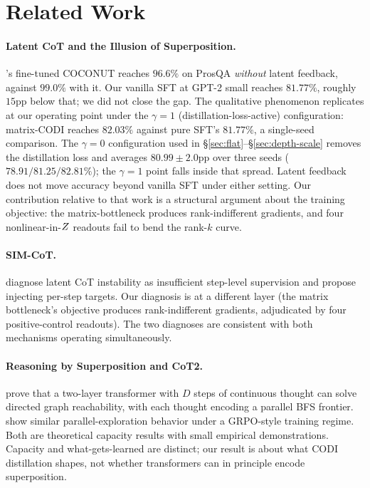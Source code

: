 \section{Related Work}
\label{sec:related}

\paragraph{Latent CoT and the Illusion of Superposition.}
\citet{rizvi2026illusion}'s fine-tuned COCONUT reaches $96.6\%$ on
ProsQA \emph{without} latent feedback, against $99.0\%$ with it.
Our vanilla SFT at GPT-2 small reaches $81.77\%$, roughly $15$pp
below that; we did not close the gap. The qualitative phenomenon
replicates at our operating point under the $\gamma=1$
(distillation-loss-active) configuration: matrix-CODI reaches
$82.03\%$ against pure SFT's $81.77\%$, a single-seed comparison. The
$\gamma=0$ configuration used in \S\ref{sec:flat}--\S\ref{sec:depth-scale}
removes the distillation loss and averages $80.99\pm2.0$pp over three
seeds ($78.91/81.25/82.81\%$); the $\gamma=1$ point falls inside that
spread. Latent feedback does not move accuracy beyond vanilla SFT under
either setting. Our
contribution relative to that work is a structural argument about
the training objective: the matrix-bottleneck produces
rank-indifferent gradients, and four nonlinear-in-$Z$ readouts
fail to bend the rank-$k$ curve.

\paragraph{SIM-CoT.}
\citet{shen2025simcot} diagnose latent CoT instability as
insufficient step-level supervision and propose injecting per-step
targets. Our diagnosis is at a different layer (the matrix
bottleneck's objective produces rank-indifferent gradients,
adjudicated by four positive-control readouts). The two diagnoses
are consistent with both mechanisms operating simultaneously.

\paragraph{Reasoning by Superposition and CoT2.}
\citet{zhu2025superposition} prove that a two-layer transformer
with $D$ steps of continuous thought can solve directed graph
reachability, with each thought encoding a parallel BFS frontier.
\citet{gozeten2025cot2} show similar parallel-exploration behavior
under a GRPO-style training regime. Both are theoretical capacity
results with small empirical demonstrations. Capacity and
what-gets-learned are distinct; our result is about what CODI
distillation shapes, not whether transformers can in principle
encode superposition.

